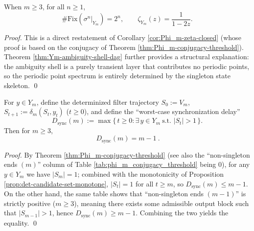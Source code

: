 \begin{corollary}\label{cor:Ym-periodic-rigidity}
When $m\ge 3$, for all $n\ge 1$,
\[
\#\mathrm{Fix}(\sigma^n|_{Y_m})=2^n,
\qquad
\zeta_{Y_m}(z)=\frac{1}{1-2z}.
\]
\end{corollary}
\begin{proof}
This is a direct restatement of Corollary \ref{cor:Phi_m-zeta-closed} (whose proof is based on the conjugacy of Theorem \ref{thm:Phi_m-conjugacy-threshold}). Theorem \ref{thm:Ym-ambiguity-shell-dag} further provides a structural explanation: the ambiguity shell is a purely transient layer that contributes no periodic points, so the periodic point spectrum is entirely determined by the singleton state skeleton. \qed
\end{proof}

\begin{corollary}\label{cor:Ym-sync-delay}
For $y\in Y_m$, define the determinized filter trajectory $S_0:=V_m$, $S_{t+1}:=\delta_m(S_t,y_t)$ ($t\ge 0$), and define the ``worst-case synchronization delay''
\[
D_{\mathrm{sync}}(m):=\max\{\,t\ge 0:\exists\,y\in Y_m\ \text{s.t. }|S_t|>1\,\}.
\]
Then for $m\ge 3$,
\[
\boxed{\ D_{\mathrm{sync}}(m)=m-1\ }.
\]
\end{corollary}
\begin{proof}
By Theorem \ref{thm:Phi_m-conjugacy-threshold} (see also the ``non-singleton ends $(m)$'' column of Table \ref{tab:phi_m_conjugacy_threshold} being $0$), for any $y\in Y_m$ we have $|S_m|=1$; combined with the monotonicity of Proposition \ref{prop:det-candidate-set-monotone}, $|S_t|=1$ for all $t\ge m$, so $D_{\mathrm{sync}}(m)\le m-1$.
On the other hand, the same table shows that ``non-singleton ends $(m-1)$'' is strictly positive ($m\ge 3$), meaning there exists some admissible output block such that $|S_{m-1}|>1$, hence $D_{\mathrm{sync}}(m)\ge m-1$. Combining the two yields the equality. \qed
\end{proof}

